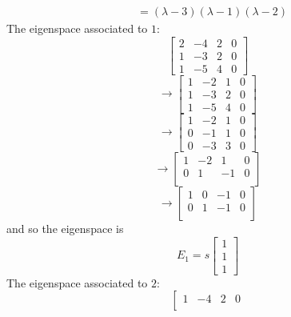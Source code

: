 \documentclass{article}
\begin{document}
\begin{Answer}
\begin{align*}
    &= (\lambda-3)(\lambda -1)(\lambda -2)
  \end{align*}
  The eigenspace associated to $1$:
  \begin{equation*}
  \left[
  \begin{array}{ccc|c}
  2&-4&2&0\\
  1&-3&2&0\\
  1&-5&4&0
  \end{array}
  \right]
  \end{equation*}
  \begin{equation*}
  \rightarrow\left[
  \begin{array}{ccc|c}
  1&-2&1&0\\
  1&-3&2&0\\
  1&-5&4&0
  \end{array}
  \right]
  \end{equation*}
  \begin{equation*}
  \rightarrow\left[
  \begin{array}{ccc|c}
  1&-2&1&0\\
  0&-1&1&0\\
  0&-3&3&0
  \end{array}
  \right]
  \end{equation*}
  \begin{equation*}
  \rightarrow\left[
  \begin{array}{ccc|c}
  1&-2&1&0\\
  0&1&-1&0\\
  \end{array}
  \right]
  \end{equation*}
  \begin{equation*}
  \rightarrow\left[
  \begin{array}{ccc|c}
  1&0&-1&0\\
  0&1&-1&0\\
  \end{array}
  \right]
  \end{equation*}
  and so the eigenspace is
  \begin{equation*}
  E_1 = s \left[
  \begin{array}{c}
  1\\
  1\\
  1
  \end{array}
  \right]
  \end{equation*}
  The eigenspace associated to $2$:
  \begin{equation*}
  \left[
  \begin{array}{ccc|c}
  1&-4&2&0\\

\end{array}
\end{equation*}
\end{Answer}
\end{document}
